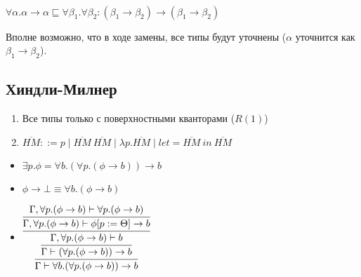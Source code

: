\begin{example}\

$\forall \alpha . \alpha \rightarrow \alpha
\sqsubseteq
\forall \beta_1.\forall \beta_2: (\beta_1 \rightarrow \beta_2) \rightarrow (\beta_1 \rightarrow \beta_2)$

Вполне возможно, что в ходе замены, все типы будут уточнены ($\alpha$ уточнится как $\beta_1 \rightarrow \beta_2$).
\end{example}


\subsection{Хиндли-Милнер}

\begin{enumerate}
    \item Все типы только с поверхностными кванторами ($R(1)$)
    \item $\overline{HM} ::= p \mid \overline{HM}\ \overline{HM} \mid \lambda p. \overline{HM} \mid let =  \overline{HM}\ in\ \overline{HM}$
\end{enumerate}

\begin{itemize}
    \item $\exists p.\phi = \forall b.(\forall p. (\phi \rightarrow b)) \rightarrow b$
    \item $\phi \rightarrow \bot \equiv \forall b. (\phi \rightarrow b)$

    \item $\vcenter{\infer[]{\Gamma \vdash \forall b.(\forall p.(\phi \rightarrow b)) \rightarrow b}{\infer{\Gamma \vdash (\forall p. (\phi \rightarrow b)) \rightarrow b}{\infer{\Gamma, \forall p. (\phi \rightarrow b) \vdash b}{\infer{\Gamma, \forall p. (\phi \rightarrow b) \vdash \phi [p := \Theta] \rightarrow b}{\Gamma, \forall p. (\phi \rightarrow b) \vdash \forall p.(\phi \rightarrow b)}}}}}$
\end{itemize}

